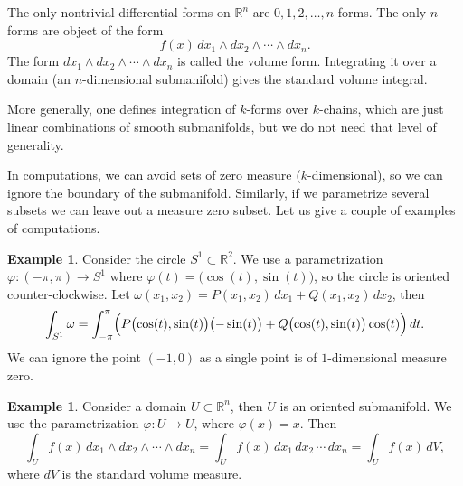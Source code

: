 \documentclass[12pt,openany]{book}
\newcommand{\R}{{\mathbb{R}}}
\theoremstyle{plain}
\theoremstyle{remark}
\theoremstyle{definition}
\theoremstyle{exercise}
\theoremstyle{example}
\newtheorem{example}[thm]{Example}
\begin{document}
The only nontrivial differential forms on $\R^n$
are $0,1,2,\ldots,n$ forms.  The only $n$-forms are
object of the form
\begin{equation*}
f(x) \,
dx_1 \wedge dx_2 \wedge \cdots \wedge dx_n .
\end{equation*}
The form $dx_1 \wedge dx_2 \wedge \cdots \wedge dx_n$ is called the
volume form.  Integrating it over a domain (an $n$-dimensional submanifold)
gives the standard volume integral.

More generally, one defines integration of $k$-forms over $k$-chains,
which are just linear combinations of smooth submanifolds, but we do not
need that level of generality.

\medskip

In computations, we can avoid sets of zero measure ($k$-dimensional),
so we can ignore the boundary of the submanifold.  Similarly, if we parametrize
several subsets we can leave out a measure zero subset.
Let us give a couple of examples of computations.

\begin{example} \label{example:diffformscircleint}
Consider the circle $S^1 \subset
\R^2$.  We use a parametrization $\varphi \colon (-\pi,\pi) \to S^1$
where $\varphi(t) = \bigl(\cos(t),\sin(t)\bigr)$, so the circle is oriented
counter-clockwise.
Let $\omega(x_1,x_2) = P(x_1,x_2) \, dx_1 + Q(x_1,x_2) \, dx_2$, then
\begin{equation*}
\int_{S^1} \omega =
\int_{-\pi}^{\pi}
\Bigl(
P\bigl(\cos(t),\sin(t)\bigr) \bigl(-\sin(t)\bigr)  +
Q\bigl(\cos(t),\sin(t)\bigr) \cos(t) \Bigr) \, dt .
\end{equation*}
We can ignore the point $(-1,0)$ as a single point is of $1$-dimensional
measure zero.
\end{example}

\begin{example}
Consider a domain $U \subset \R^n$, then $U$ is an oriented submanifold.
We use the parametrization $\varphi \colon U \to U$, where $\varphi(x) =
x$.  Then
\begin{equation*}
\int_U f(x) \, dx_1 \wedge dx_2 \wedge \cdots \wedge dx_n
=
\int_U f(x) \, dx_1 \, dx_2 \,  \cdots \, dx_n
=
\int_U f(x) \, dV ,
\end{equation*}
where $dV$ is the standard volume measure.
\end{example}
\end{document}
